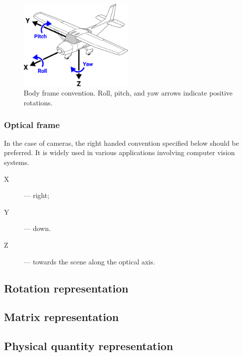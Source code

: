 \begin{figure}[hbt]
    \centering
	\includegraphics[width=0.5\textwidth]{application_layer/aircraft_principal_axes}
    \caption{
        Body frame convention. Roll, pitch, and yaw arrows indicate positive rotations.
        \label{fig:application_body_frame_convention}
    }
\end{figure}

\subsubsection{Optical frame}

In the case of cameras, the right handed convention specified below should be preferred.
It is widely used in various applications involving computer vision systems.
\begin{samepage}
\begin{description}
    \item[X] --- right;
    \item[Y] --- down.
    \item[Z] --- towards the scene along the optical axis.
\end{description}
\end{samepage}

\subsection{Rotation representation}

\subsection{Matrix representation}

\subsection{Physical quantity representation}
